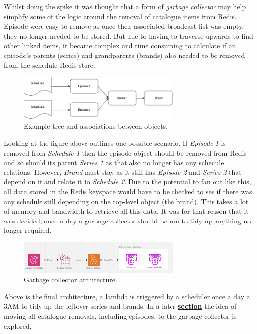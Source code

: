   Whilst doing the spike it was thought that a form of \textit{garbage collector} may help simplify some of the logic around the removal of catalogue items
  from Redis. Episode were easy to remove as once their associated broadcast list was empty, they no longer needed to be stored. But due to having to 
  traverse upwards to find other linked items, it became complex and time consuming to calculate if an episode's parents (series) and grandparents (brands)
  also needed to be removed from the schedule Redis store.

  \begin{figure}[H]
    \centering
    \includegraphics[width=8cm]{assets/catalogueTree.drawio.png}
    \caption{Example tree and associations between objects.}
    \label{fig:catalogueTree}
  \end{figure}

  Looking at the figure above outlines one possible scenario. If \emph{Episode 1} is removed from \emph{Schedule 1} then the episode object should be removed
  from Redis and so should its parent \emph{Series 1} as that also no longer has any schedule relations. However, \emph{Brand} must stay as it still
  has \emph{Episode 2} and \emph{Series 2} that depend on it and relate it to \emph{Schedule 2}. Due to the potential to fan out like this, all data stored
  in the Redis keyspace would have to be checked to see if there was any schedule still depending on the top-level object (the brand). This takes a lot of
  memory and bandwidth to retrieve all this data. It was for that reason that it was decided, once a day a garbage collector should be ran to 
  tidy up anything no longer required.

  \begin{figure}[H]
    \centering
    \includegraphics[width=8cm]{assets/architectures/garbageCollector.png}
    \caption{Garbage collector architecture.}
    \label{fig:garbageCollectorArchitecture}
  \end{figure}

  Above is the final architecture, a lambda is triggered by a scheduler once a day a 3AM to tidy up the leftover series and brands. In a later
  \hyperref[sec:garbageCollectorConsolidation]{\textbf{section}} the idea of moving all catalogue removals, including episodes, to the garbage 
  collector is explored.

